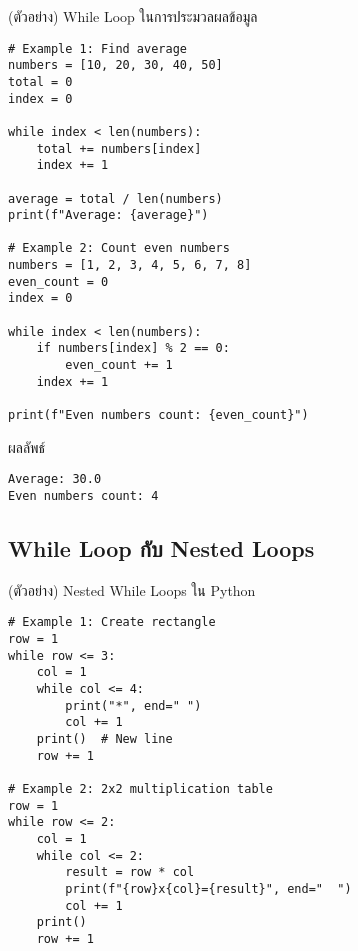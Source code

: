 \documentclass[12pt,a4paper]{article}
\newcommand{\textlight}[1]{{\thailightfont #1}}
\begin{document}
\hspace{1cm}\textlight{While Loop มีบทบาทสำคัญในการประมวลผลข้อมูลเมื่อเราไม่ทราบขนาดหรือจำนวนข้อมูลที่แน่นอนล่วงหน้า เช่น การอ่านไฟล์ข้อมูล การรับ input จากผู้ใช้แบบต่อเนื่อง หรือการค้นหาข้อมูลที่ตรงตามเงื่อนไข ทักษะนี้มีความสำคัญมากในการพัฒนาแอปพลิเคชันที่ทำงานกับข้อมูลจริง}

\begin{codebox}{(ตัวอย่าง) While Loop ในการประมวลผลข้อมูล}
\begin{lstlisting}[style=python]
# Example 1: Find average
numbers = [10, 20, 30, 40, 50]
total = 0
index = 0

while index < len(numbers):
    total += numbers[index]
    index += 1

average = total / len(numbers)
print(f"Average: {average}")

# Example 2: Count even numbers
numbers = [1, 2, 3, 4, 5, 6, 7, 8]
even_count = 0
index = 0

while index < len(numbers):
    if numbers[index] % 2 == 0:
        even_count += 1
    index += 1

print(f"Even numbers count: {even_count}")
\end{lstlisting}
\end{codebox}

\begin{resultbox}{ผลลัพธ์}
\begin{verbatim}
Average: 30.0
Even numbers count: 4
\end{verbatim}
\end{resultbox}

\vspace{3cm}

\subsection{While Loop กับ Nested Loops}

\hspace{1cm}\textlight{การซ้อน While Loop เป็นเทคนิคขั้นสูงที่ใช้สำหรับการประมวลผลข้อมูลที่มีโครงสร้างหลายมิติ เช่น การทำงานกับ matrix การสร้างตารางข้อมูล หรือการจำลองสถานการณ์ที่ซับซ้อน แม้จะเป็นเทคนิคที่ต้องใช้ความระมัดระวังในการเขียนเงื่อนไข แต่เป็นทักษะที่สำคัญสำหรับนักศึกษาระดับปริญญาตรี}

\begin{codebox}{(ตัวอย่าง) Nested While Loops ใน Python}
\begin{lstlisting}[style=python]
# Example 1: Create rectangle
row = 1
while row <= 3:
    col = 1
    while col <= 4:
        print("*", end=" ")
        col += 1
    print()  # New line
    row += 1

# Example 2: 2x2 multiplication table
row = 1
while row <= 2:
    col = 1
    while col <= 2:
        result = row * col
        print(f"{row}x{col}={result}", end="  ")
        col += 1
    print()
    row += 1
\end{lstlisting}
\end{codebox}
\end{document}
